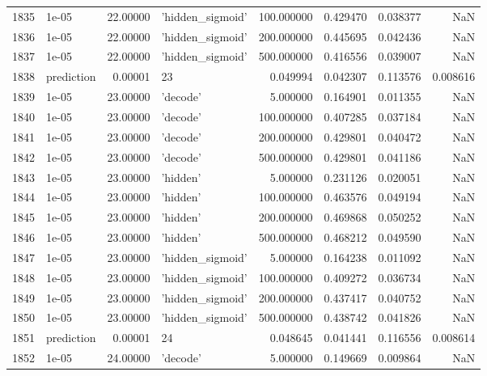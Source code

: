 \documentclass[10pt,a4paper]{article}
\begin{document}
\begin{tabular}{llrlrrrr}
1835 &       1e-05 &  22.00000 &   'hidden\_sigmoid' &  100.000000 &  0.429470 &  0.038377 &       NaN \\
1836 &       1e-05 &  22.00000 &   'hidden\_sigmoid' &  200.000000 &  0.445695 &  0.042436 &       NaN \\
1837 &       1e-05 &  22.00000 &   'hidden\_sigmoid' &  500.000000 &  0.416556 &  0.039007 &       NaN \\
1838 &  prediction &   0.00001 &                 23 &    0.049994 &  0.042307 &  0.113576 &  0.008616 \\
1839 &       1e-05 &  23.00000 &           'decode' &    5.000000 &  0.164901 &  0.011355 &       NaN \\
1840 &       1e-05 &  23.00000 &           'decode' &  100.000000 &  0.407285 &  0.037184 &       NaN \\
1841 &       1e-05 &  23.00000 &           'decode' &  200.000000 &  0.429801 &  0.040472 &       NaN \\
1842 &       1e-05 &  23.00000 &           'decode' &  500.000000 &  0.429801 &  0.041186 &       NaN \\
1843 &       1e-05 &  23.00000 &           'hidden' &    5.000000 &  0.231126 &  0.020051 &       NaN \\
1844 &       1e-05 &  23.00000 &           'hidden' &  100.000000 &  0.463576 &  0.049194 &       NaN \\
1845 &       1e-05 &  23.00000 &           'hidden' &  200.000000 &  0.469868 &  0.050252 &       NaN \\
1846 &       1e-05 &  23.00000 &           'hidden' &  500.000000 &  0.468212 &  0.049590 &       NaN \\
1847 &       1e-05 &  23.00000 &   'hidden\_sigmoid' &    5.000000 &  0.164238 &  0.011092 &       NaN \\
1848 &       1e-05 &  23.00000 &   'hidden\_sigmoid' &  100.000000 &  0.409272 &  0.036734 &       NaN \\
1849 &       1e-05 &  23.00000 &   'hidden\_sigmoid' &  200.000000 &  0.437417 &  0.040752 &       NaN \\
1850 &       1e-05 &  23.00000 &   'hidden\_sigmoid' &  500.000000 &  0.438742 &  0.041826 &       NaN \\
1851 &  prediction &   0.00001 &                 24 &    0.048645 &  0.041441 &  0.116556 &  0.008614 \\
1852 &       1e-05 &  24.00000 &           'decode' &    5.000000 &  0.149669 &  0.009864 &       NaN \\

\end{tabular}
\end{document}
